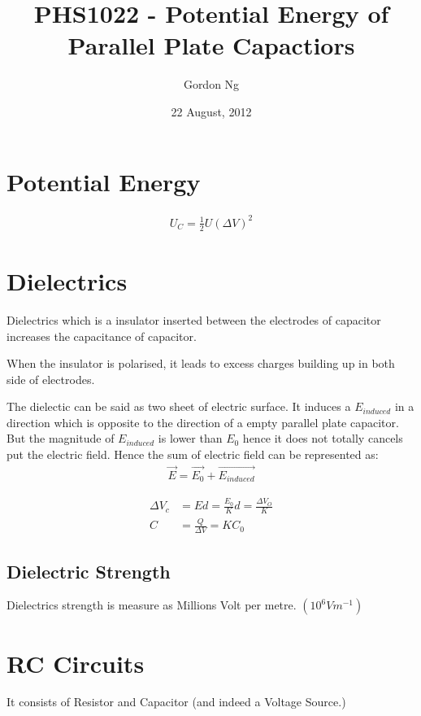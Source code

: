 \documentclass[12pt]{article}
\begin{document}
\title{PHS1022 - Potential Energy of Parallel Plate Capactiors}
\date{22 August, 2012}
\author{Gordon Ng}
\maketitle
\pagebreak
\tableofcontents
\pagebreak
\section{Potential Energy}
\begin{align}
U_{C}=\frac{1}{2}U (\Delta V)^2
\end{align}
\section{Dielectrics}
Dielectrics which is a insulator inserted between the electrodes of capacitor increases the capacitance of capacitor.

When the insulator is polarised, it leads to excess charges building up in both side of electrodes.

The dielectic can be said as two sheet of electric surface. It induces a $E_{induced}$ in a direction which is opposite to the direction of a empty parallel plate capacitor.  But the magnitude of $E_{induced}$ is lower than $E_0$ hence it does not totally cancels put the electric field. Hence the sum of electric field can be represented as:
\begin{align}
\vec{E}=\vec{E_0}+\vec{E_{induced}}
\end{align}

\begin{align}
\Delta V_c &= Ed = \frac{E_0}{K}d = \frac{\Delta V_O}{K} \\
C&=\frac{Q}{\Delta V}=K C_0
\end{align}

\subsection{Dielectric Strength}
Dielectrics strength is measure as Millions Volt per metre. $(10^6V m^{-1})$
\pagebreak
\section{RC Circuits}
It consists of Resistor and Capacitor (and indeed a Voltage Source.)
\end{document}
